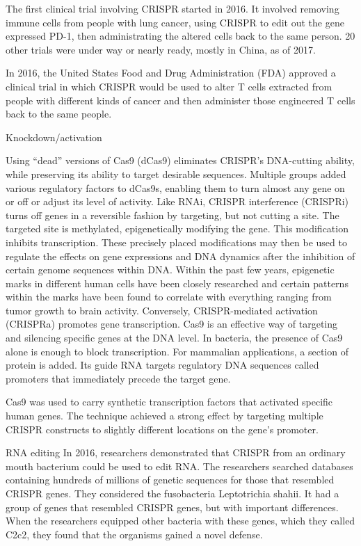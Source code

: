 The first clinical trial involving CRISPR started in 2016. It involved removing immune cells from people with lung cancer, using CRISPR to edit out the gene expressed PD-1, then administrating the altered cells back to the same person. 20 other trials were under way or nearly ready, mostly in China, as of 2017.

In 2016, the United States Food and Drug Administration (FDA) approved a clinical trial in which CRISPR would be used to alter T cells extracted from people with different kinds of cancer and then administer those engineered T cells back to the same people.

Knockdown/activation

Using ``dead'' versions of Cas9 (dCas9) eliminates CRISPR's DNA-cutting ability, while preserving its ability to target desirable sequences. Multiple groups added various regulatory factors to dCas9s, enabling them to turn almost any gene on or off or adjust its level of activity. Like RNAi, CRISPR interference (CRISPRi) turns off genes in a reversible fashion by targeting, but not cutting a site. The targeted site is methylated, epigenetically modifying the gene. This modification inhibits transcription. These precisely placed modifications may then be used to regulate the effects on gene expressions and DNA dynamics after the inhibition of certain genome sequences within DNA. Within the past few years, epigenetic marks in different human cells have been closely researched and certain patterns within the marks have been found to correlate with everything ranging from tumor growth to brain activity. Conversely, CRISPR-mediated activation (CRISPRa) promotes gene transcription. Cas9 is an effective way of targeting and silencing specific genes at the DNA level. In bacteria, the presence of Cas9 alone is enough to block transcription. For mammalian applications, a section of protein is added. Its guide RNA targets regulatory DNA sequences called promoters that immediately precede the target gene.

Cas9 was used to carry synthetic transcription factors that activated specific human genes. The technique achieved a strong effect by targeting multiple CRISPR constructs to slightly different locations on the gene's promoter.

RNA editing
In 2016, researchers demonstrated that CRISPR from an ordinary mouth bacterium could be used to edit RNA. The researchers searched databases containing hundreds of millions of genetic sequences for those that resembled CRISPR genes. They considered the fusobacteria Leptotrichia shahii. It had a group of genes that resembled CRISPR genes, but with important differences. When the researchers equipped other bacteria with these genes, which they called C2c2, they found that the organisms gained a novel defense.

